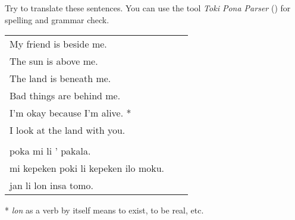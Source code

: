 Try to translate these sentences. 
You can use the tool \textit{Toki Pona Parser} (\cite{www:rowa:02}) for spelling and grammar check. 

\begin{supertabular}{p{5,5cm}|ll}
My friend is beside me. && \\ %
The sun is above me. && \\ %
The land is beneath me. && \\ %
Bad things are behind me. && \\ %
I'm okay because I'm alive. * && \\ %
I look at the land with you. && \\ %
 && \\ %
poka mi li ' pakala. && \\ %
mi kepeken poki li kepeken ilo moku. && \\ %
jan li lon insa tomo. && \\ %
\end{supertabular} 

* \textit{lon} as a verb by itself means to exist, to be real, etc. 
% 

